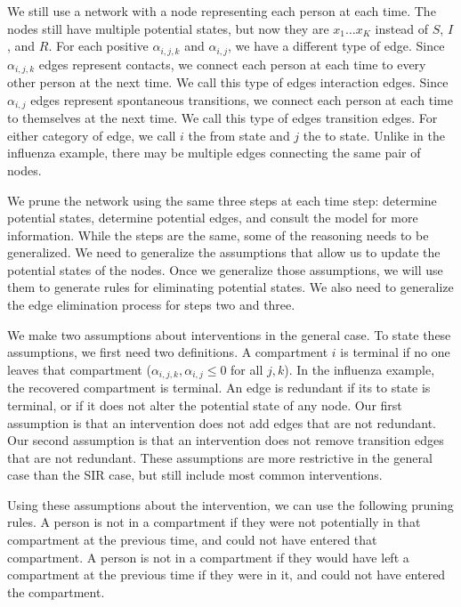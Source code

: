 \documentclass[PTRSB]{rsos}
\begin{document}
\begin{multicols}{2}
We still use a network with a node representing each person at each time.
The nodes still have multiple potential states, but now they are $x_1 \dots x_K$ instead of $S$, $I$, and $R$.
For each positive $\alpha_{i,j,k} $ and $\alpha_{i,j}$, we have a different type of edge.
Since $\alpha_{i,j,k}$ edges represent contacts, we connect each person at each time to every other person at the next time.
We call this type of edges interaction edges.
Since $\alpha_{i,j}$ edges represent spontaneous transitions, we connect each person at each time to themselves at the next time.
We call this type of edges transition edges.
For either category of edge, we call $i$ the from state and $j$ the to state.
Unlike in the influenza example, there may be multiple edges connecting the same pair of nodes.

We prune the network using the same three steps at each time step: determine potential states, determine potential edges, and consult the model for more information.
While the steps are the same, some of the reasoning needs to be generalized.
We need to generalize the assumptions that allow us to update the potential states of the nodes.
Once we generalize those assumptions, we will use them to generate rules for eliminating potential states.
We also need to generalize the edge elimination process for steps two and three.

We make two assumptions about interventions in the general case.
To state these assumptions, we first need two definitions.
A compartment $i$ is terminal if no one leaves that compartment ($\alpha_{i,j,k},\alpha_{i,j} \leq 0$ for all $j,k$).
In the influenza example, the recovered compartment is terminal.
An edge is redundant if its to state is terminal, or if it does not alter the potential state of any node.
Our first assumption is that an intervention does not add edges that are not redundant.
Our second assumption is that an intervention does not remove transition edges that are not redundant.
These assumptions are more restrictive in the general case than the SIR case, but still include most common interventions.

Using these assumptions about the intervention, we can use the following pruning rules.
A person is not in a compartment if they were not potentially in that compartment at the previous time, and could not have entered that compartment.
A person is not in a compartment if they would have left a compartment at the previous time if they were in it, and could not have entered the compartment.


\end{multicols}
\end{document}
